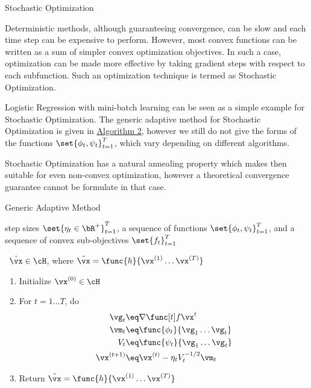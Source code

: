 \documentclass{article}
\begin{document}
\begin{psection}{Stochastic Optimization}

	Deterministic methods, although guaranteeing convergence, can be slow and each time step can be expensive to perform. However, most convex functions can be written as a sum of simpler convex optimization objectives. In such a case, optimization can be made more effective by taking gradient steps with respect to each subfunction. Such an optimization technique is termed as Stochastic Optimization.

	Logistic Regression with mini-batch learning can be seen as a simple example for Stochastic Optimization. The generic adaptive method for Stochastic Optimization is given in \hyperlink{algo:2}{Algorithm 2}, however we still do not give the forms of the functions $\set{\phi_t, \psi_t}_{t = 1}^T$, which vary depending on different algorithms.

	Stochastic Optimization has a natural annealing property which makes then suitable for even non-convex optimization, however a theoretical convergence guarantee cannot be formulate in that case.

	\begin{algo}[0.9\textwidth]{Generic Adaptive Method}

		 \quad step sizes $\set{\eta_t \in \bR^{+}}_{t = 1}^T$, a sequence of functions $\set{\phi_t, \psi_t}_{t = 1}^T$, and a sequence of convex sub-objectives $\set{f_t}_{t = 1}^T$ \sbr

		\, $\hat{\vx} \in \cH$, where $\hat{\vx} = \func{h}{\vx^{(1)} \dots \vx^{(T)}}$ \sbr


		\begin{enumerate}
			\item Initialize $\vx^{(0)} \in \cH$
			\item For $t = 1 \dots T$, do
				\begin{align*}
					\vg_t			&\eq	\gf[t]{t}					\\
					\vm_t			&\eq	\func{\phi_t}{\vg_1 \dots \vg_t}			\\
					V_t				&\eq	\func{\psi_t}{\vg_1 \dots \vg_t}			\\
					\vx^{(t + 1)}	&\eq	\vx^{(t)} - \eta_t V_t^{- 1 / 2} \vm_t
				\end{align*}
			\item Return $\hat{\vx} = \func{h}{\vx^{(1)} \dots \vx^{(T)}}$
		\end{enumerate}


\end{algo}
\end{psection}
\end{document}
